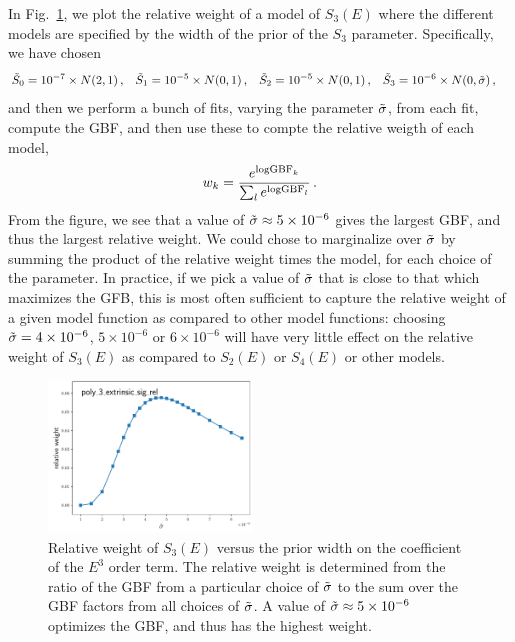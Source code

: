 \documentclass[prd,10pt,superscriptaddress,notitlepage,tightenlines,nofootinbib,floatfix]{revtex4-1}
\begin{document}
In Fig.~\ref{fig:poly_3_prior}, we plot the relative weight of a model of $S_3(E)$ where the different models are specified by the width of the prior of the $S_3$ parameter.  Specifically, we have chosen
\begin{align}\label{eq:poly_priors}
&\tilde{S}_0 = 10^{-7}\times N(2,1)\, ,&
&\tilde{S}_1 = 10^{-5}\times N(0,1)\, ,&
&\tilde{S}_2 = 10^{-5}\times N(0,1)\, ,&
&\tilde{S}_3 = 10^{-6}\times N(0, \tilde{{\sigma}})\, ,&
\end{align}
and then we perform a bunch of fits, varying the parameter $\tilde{{\sigma}}$, from each fit, compute the GBF, and then use these to compte the relative weigth of each model,
\begin{equation}
w_k = \frac{e^{{\rm logGBF}_k}}{\sum_l e^{{\rm logGBF}_l}}\, .
\end{equation}
From the figure, we see that a value of $\tilde{{\sigma}}\approx5\times10^{-6}$ gives the largest GBF, and thus the largest relative weight.
We could chose to marginalize over $\tilde{{\sigma}}$ by summing the product of the relative weight times the model, for each choice of the parameter.
In practice, if we pick a value of $\tilde{{\sigma}}$ that is close to that which maximizes the GFB, this is most often sufficient to capture the relative weight of a given model function as compared to other model functions: choosing $\tilde{{\sigma}} = 4\times10^{-6}$, $5\times10^{-6}$ or $6\times10^{-6}$ will have very little effect on the relative weight of $S_3(E)$ as compared to $S_2(E)$ or $S_4(E)$ or other models.

\begin{figure}
\includegraphics[width=0.48\textwidth]{figures/poly_3_extrinsic_sig_rel_prior_width_study}
\caption{\label{fig:poly_3_prior}
Relative weight of $S_3(E)$ versus the prior width on the coefficient of the $E^3$ order term.
The relative weight is determined from the ratio of the GBF from a particular choice of $\tilde{{\sigma}}$ to the sum over the GBF factors from all choices of $\tilde{{\sigma}}$.  A value of $\tilde{{\sigma}}\approx5\times10^{-6}$ optimizes the GBF, and thus has the highest weight.}
\end{figure}
\end{document}
